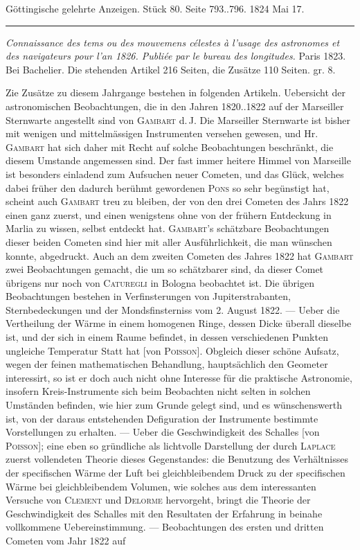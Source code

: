 \clearpage
{}
\hypertarget{native-643-lower}{}
\begin{center}\small Göttingische gelehrte Anzeigen. Stück 80. Seite 793..796. 1824 Mai 17.\\[3pt]\rule{.72\linewidth}{.3pt}\end{center}

\emph{Connaissance des tems ou des mouvemens célestes à l'usage des astronomes et des navigateurs pour l'an \textup{1826}. Publiée par le bureau des longitudes.} Paris 1823. Bei Bachelier. Die stehenden Artikel 216 Seiten, die Zusätze 110 Seiten. gr. 8.

Zie Zusätze zu diesem Jahrgange bestehen in folgenden Artikeln. Uebersicht der astronomischen Beobachtungen, die in den Jahren 1820..1822 auf der Marseiller Sternwarte angestellt sind von \textsc{Gambart} d.\,J. Die Marseiller Sternwarte ist bisher mit wenigen und mittelmässigen Instrumenten versehen gewesen, und Hr. \textsc{Gambart} hat sich daher mit Recht auf solche Beobachtungen beschränkt, die diesem Umstande angemessen sind. Der fast immer heitere Himmel von Marseille ist besonders einladend zum Aufsuchen neuer Cometen, und das Glück, welches dabei früher den dadurch berühmt gewordenen \textsc{Pons} so sehr begünstigt hat, scheint auch \textsc{Gambart} treu zu bleiben, der von den drei Cometen des Jahrs 1822 einen ganz zuerst, und einen wenigstens ohne von der frühern Entdeckung in Marlia zu wissen, selbst entdeckt hat. \textsc{Gambart}'s schätzbare Beobachtungen dieser beiden Cometen sind hier mit aller Ausführlichkeit, die man wünschen konnte, abgedruckt. Auch an dem zweiten Cometen des Jahres 1822 hat \textsc{Gambart} zwei Beobachtungen gemacht, die um so schätzbarer sind, da dieser Comet übrigens nur noch von \textsc{Caturegli} in Bologna beobachtet ist. Die übrigen Beobachtungen bestehen in Verfinsterungen von Jupiterstrabanten, Sternbedeckungen und der Mondsfinsterniss vom 2. August 1822. --- Ueber die Vertheilung der Wärme in einem homogenen Ringe, dessen Dicke überall dieselbe ist, und der sich in einem Raume befindet, in dessen verschiedenen Punkten ungleiche Temperatur Statt hat [von \textsc{Poisson}]. Obgleich dieser schöne Aufsatz, wegen der feinen mathematischen Behandlung, hauptsächlich den Geometer interessirt, so ist er doch auch nicht ohne Interesse für die praktische Astronomie, insofern Kreis-Instrumente sich beim Beobachten nicht selten in solchen Umständen befinden, wie hier zum Grunde gelegt  sind, und es wünschenswerth ist, von der daraus entstehenden Defiguration der Instrumente bestimmte Vorstellungen zu erhalten. --- Ueber die Geschwindigkeit des Schalles [von \textsc{Poisson}]; eine eben so gründliche als lichtvolle Darstellung der durch \textsc{Laplace} zuerst vollendeten Theorie dieses Gegenstandes: die Benutzung des Verhältnisses der specifischen Wärme der Luft bei gleichbleibendem Druck zu der specifischen Wärme bei gleichbleibendem Volumen, wie solches aus dem interessanten Versuche von \textsc{Clement} und \textsc{Delorme} hervorgeht, bringt die Theorie der Geschwindigkeit des Schalles mit den Resultaten der Erfahrung in beinahe vollkommene Uebereinstimmung. --- Beobachtungen des ersten und dritten Cometen vom Jahr 1822 auf 